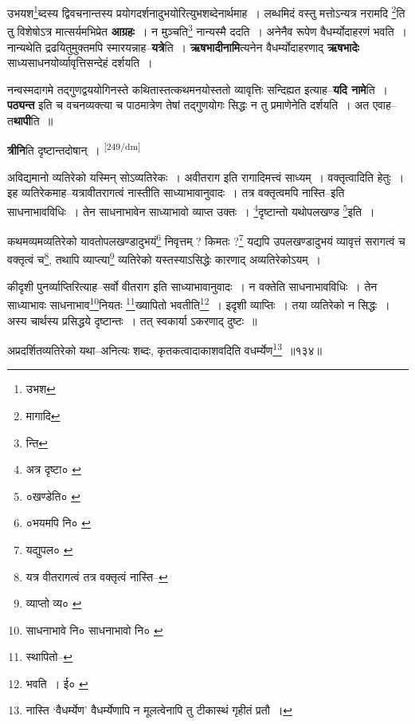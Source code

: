 \documentclass[article,12pt,a4paper]{memoir}
\begin{document}
	  \pstart उभयश\footnote{उभश}ब्दस्य द्विवचनान्तस्य प्रयोगदर्शनादुभयोरित्युभशब्देनार्थमाह । लब्धमिदं वस्तु मत्तोऽन्यत्र नरामदि \footnote{मागादि}ति तु विशेषोऽत्र मात्सर्यमभिप्रेत \textbf{आग्रहः} । न मुञ्चति\footnote{न्ति} नान्यस्मै ददति । अनेनैव रूपेण वैधर्म्योदाहरणं भवति । नान्यथेति द्रढयितुमुक्तमपि स्मारयन्नाह--\textbf{यत्रे}ति । \textbf{ऋषभादीनामि}त्यनेन वैधर्म्योदाहरणाद् \textbf{ऋषभादेः} साध्यसाधनयोर्व्यावृत्तिसन्देहं दर्शयति ।
	\pend
      

	  \pstart नन्वस्मदागमे तद्गुणद्वययोगिनस्ते कथितास्तत्कथमनयोस्ततो व्यावृत्तिः सन्दिह्यत इत्याह--\textbf{यदि नामे}ति । \textbf{पठ्यन्त} इति च वचनव्यक्त्या च पाठमात्रेण तेषां तद्गुणयोगः सिद्धः न तु प्रमाणेनेति दर्शयति । अत एवाह--त\textbf{थापी}ति ॥
	\pend
      

	  \pstart \textbf{त्रीनि}ति दृष्टान्तदोषान् ।
	\pend
      \leavevmode\textsuperscript{\rmlatinfont\tiny [249/dm]}

	  \pstart अविद्यमानो व्यतिरेको यस्मिन् सोऽव्यतिरेकः । अवीतराग इति रागादिमत्त्वं साध्यम् । वक्तृत्वादिति हेतुः । इह व्यतिरेकमाह--यत्रावीतरागत्वं नास्तीति साध्याभावानुवादः । तत्र वक्तृत्वमपि नास्ति--इति साधनाभावविधिः । तेन साधनाभावेन साध्याभावो व्याप्त उक्तः । \footnote{अत्र दृष्टा० \cite{dp-msD}}दृष्टान्तो यथोपलखण्ड \footnote{०खण्डेति० \cite{dp-msA} \cite{dp-msB} \cite{dp-edP} \cite{dp-edH}}इति ।
	\pend
       

	  \pstart कथमव्यमव्यतिरेको यावतोपलखण्डादुभयं\footnote{०भयमपि नि० \cite{dp-msD}} निवृत्तम् ? किमतः ?\footnote{यद्युपल० \cite{dp-msA} \cite{dp-msB} \cite{dp-edP} \cite{dp-edH} \cite{dp-edE}} यद्यपि उपलखण्डादुभयं व्यावृत्तं सरागत्वं च वक्तृत्वं च\footnote{यत्र वीतरागत्वं तत्र वक्तृत्वं नास्ति--\cite{dp-msD-n}}, तथापि व्याप्त्या\footnote{व्याप्तो व्य० \cite{dp-msC}} व्यतिरेको यस्तस्याऽसिद्धेः कारणाद् अव्यतिरेकोऽयम् ।
	\pend
       

	  \pstart कीदृशी पुनर्व्याप्तिरित्याह--सर्वो वीतराग इति साध्याभावानुवादः । न वक्तेति साधनाभावविधिः । तेन साध्याभावः साधनाभाव\footnote{साधनाभावे नि० \cite{dp-msD} साधनाभावो नि० \cite{dp-msC}}नियतः \footnote{स्थापितो--\cite{dp-msA}}ख्यापितो भवतीति\footnote{भवति । ई० \cite{dp-msD} \cite{dp-msB}} । इदृशी व्याप्तिः । तया व्यतिरेको न सिद्धः । अस्य चार्थस्य प्रसिद्धये दृष्टान्तः । तत् स्वकार्या ऽकरणाद् दुष्टः ॥
	\pend
       

	  \pstart अप्रदर्शितव्यतिरेको यथा--अनित्यः शब्दः, कृतकत्वादाकाशवदिति वधर्म्येण\footnote{नास्ति ‘वैधर्म्येण’ \cite{dp-edE} वैधर्म्येणापि \cite{dp-msB} \cite{dp-msD} \cite{dp-edP} \cite{dp-edH} न मूलत्वेनापि तु टीकास्थं गृहीतं \cite{dp-edN} प्रतौ ।} ॥१३४॥
	\pend
      
\end{document}
